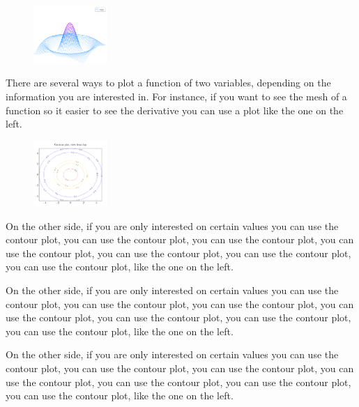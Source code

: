 \documentclass{article}
\begin{document}

\begin{figure} %
    \centering
    \includegraphics[width=0.25\textwidth]{mesh}
\end{figure}

\vspace{1.2cm}

There are several ways to plot a function of two variables, depending on the information you are interested in. For instance, if you want to see the mesh of a function so it easier to see the derivative you can use a plot like the one on the left.


\begin{figure} %
    \centering
    \includegraphics[width=0.25\textwidth]{contour}
\end{figure}

On the other side, if you are only interested on certain values you can use the contour plot, you can use the contour plot, you can use the contour plot, you can use the contour plot, you can use the contour plot, you can use the contour plot, you can use the contour plot, like the one on the left.

On the other side, if you are only interested on certain values you can use the contour plot, you can use the contour plot, you can use the contour plot, you can use the contour plot, you can use the contour plot, you can use the contour plot, you can use the contour plot, like the one on the left.

On the other side, if you are only interested on certain values you can use the contour plot, you can use the contour plot, you can use the contour plot, you can use the contour plot, you can use the contour plot, you can use the contour plot, you can use the contour plot, like the one on the left.
\end{document}

